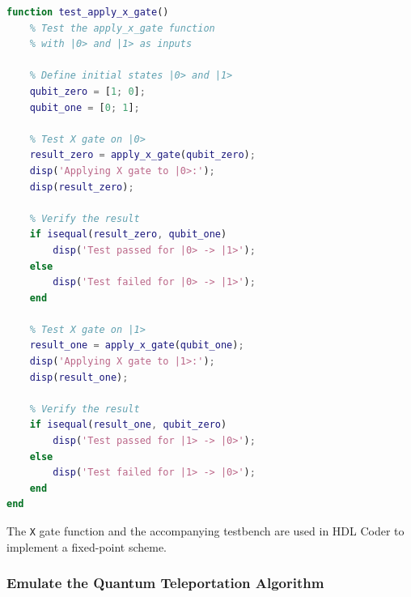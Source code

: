 \begin{lstlisting}[language=Matlab, caption={Code snippet of the MATLAB high-level description testbench for textttt{X} gate.}, label={lst:x-matlab-testbench}]
function test_apply_x_gate()
	% Test the apply_x_gate function 
	% with |0> and |1> as inputs
	
	% Define initial states |0> and |1>
	qubit_zero = [1; 0];
	qubit_one = [0; 1];
	
	% Test X gate on |0>
	result_zero = apply_x_gate(qubit_zero);
	disp('Applying X gate to |0>:');
	disp(result_zero);
	
	% Verify the result
	if isequal(result_zero, qubit_one)
		disp('Test passed for |0> -> |1>');
	else
		disp('Test failed for |0> -> |1>');
	end
	
	% Test X gate on |1>
	result_one = apply_x_gate(qubit_one);
	disp('Applying X gate to |1>:');
	disp(result_one);
	
	% Verify the result
	if isequal(result_one, qubit_zero)
		disp('Test passed for |1> -> |0>');
	else
		disp('Test failed for |1> -> |0>');
	end
end
\end{lstlisting}

The \texttt{X} gate function and the accompanying testbench are used in HDL Coder to implement a fixed-point scheme.



\subsubsection{Emulate the Quantum Teleportation Algorithm}

